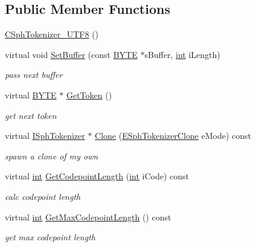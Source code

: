 \subsection*{Public Member Functions}
\begin{DoxyCompactItemize}
\item 
\hyperlink{classCSphTokenizer__UTF8_ac19feb2402d560e62a7ea89ac1a61af4}{C\-Sph\-Tokenizer\-\_\-\-U\-T\-F8} ()
\item 
virtual void \hyperlink{classCSphTokenizer__UTF8_a83a91bc88384d94b7ad7700e4c2c3958}{Set\-Buffer} (const \hyperlink{sphinxstd_8h_a4ae1dab0fb4b072a66584546209e7d58}{B\-Y\-T\-E} $\ast$s\-Buffer, \hyperlink{sphinxexpr_8cpp_a4a26e8f9cb8b736e0c4cbf4d16de985e}{int} i\-Length)
\begin{DoxyCompactList}\small\item\em pass next buffer \end{DoxyCompactList}\item 
virtual \hyperlink{sphinxstd_8h_a4ae1dab0fb4b072a66584546209e7d58}{B\-Y\-T\-E} $\ast$ \hyperlink{classCSphTokenizer__UTF8_a7e482a62632fc071cd48fe6a61427a02}{Get\-Token} ()
\begin{DoxyCompactList}\small\item\em get next token \end{DoxyCompactList}\item 
virtual \hyperlink{classISphTokenizer}{I\-Sph\-Tokenizer} $\ast$ \hyperlink{classCSphTokenizer__UTF8_a4e96d8669f4b5b9ad59c0e1f79703ea2}{Clone} (\hyperlink{sphinx_8h_adc6a6e1ffce224f14950be604087978c}{E\-Sph\-Tokenizer\-Clone} e\-Mode) const 
\begin{DoxyCompactList}\small\item\em spawn a clone of my own \end{DoxyCompactList}\item 
virtual \hyperlink{sphinxexpr_8cpp_a4a26e8f9cb8b736e0c4cbf4d16de985e}{int} \hyperlink{classCSphTokenizer__UTF8_a0c578d0013b2639640b446b3b29b7547}{Get\-Codepoint\-Length} (\hyperlink{sphinxexpr_8cpp_a4a26e8f9cb8b736e0c4cbf4d16de985e}{int} i\-Code) const 
\begin{DoxyCompactList}\small\item\em calc codepoint length \end{DoxyCompactList}\item 
virtual \hyperlink{sphinxexpr_8cpp_a4a26e8f9cb8b736e0c4cbf4d16de985e}{int} \hyperlink{classCSphTokenizer__UTF8_a3916ede974306cd534f8b39d15b0e675}{Get\-Max\-Codepoint\-Length} () const 
\begin{DoxyCompactList}\small\item\em get max codepoint length \end{DoxyCompactList}\end{DoxyCompactItemize}

